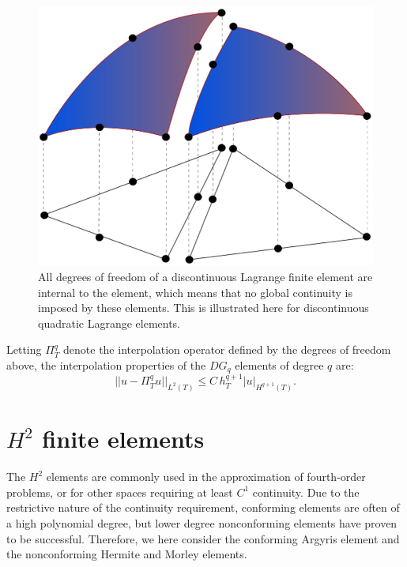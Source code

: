 \begin{figure}
  \begin{center}
    \includegraphics[width=\elmfigsizesingle]{chapters/kirby-6/pdf/dgspace.pdf}
    \caption{All degrees of freedom of a discontinuous Lagrange finite
      element are internal to the element, which means that no global
      continuity is imposed by these elements. This is illustrated
      here for discontinuous quadratic Lagrange elements.}
  \end{center}
\end{figure}

Letting $\Pi_T^q$ denote the interpolation operator defined by the
degrees of freedom above, the interpolation properties of the $DG_q$
elements of degree $q$ are:
\begin{equation}
  ||u - \Pi_T^q u||_{L^2(T)} \leqslant C \, h_T^{q + 1} |u|_{H^{q+1}(T)}.
\end{equation}

\section{$H^2$ finite elements}

The $H^2$ elements are commonly used in the approximation of
fourth-order problems, or for other spaces requiring at least $C^1$
continuity.  Due to the restrictive nature of the continuity
requirement, conforming elements are often of a high polynomial
degree, but lower degree nonconforming elements have proven to be
successful. Therefore, we here consider the conforming Argyris element
and the nonconforming Hermite and Morley elements.

